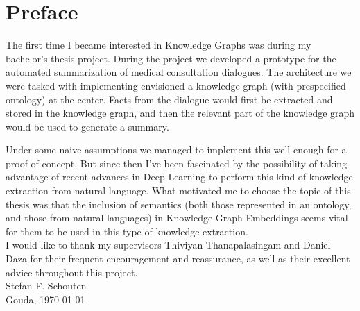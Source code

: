 \chapter{Preface}

The first time I became interested in Knowledge Graphs was during my bachelor's thesis project.
During the project we developed a prototype for the automated summarization of medical consultation dialogues. The architecture we were tasked with implementing envisioned a knowledge graph (with prespecified ontology) at the center. Facts from the dialogue would first be extracted and stored in the knowledge graph, and then the relevant part of the knowledge graph would be used to generate a summary.

Under some naive assumptions we managed to implement this well enough for a proof of concept. But since then I've been fascinated by the possibility of taking advantage of recent advances in Deep Learning to perform this kind of knowledge extraction from natural language.
What motivated me to choose the topic of this thesis was that the inclusion of semantics (both those represented in an ontology, and those from natural languages) in Knowledge Graph Embeddings seems vital for them to be used in this type of knowledge extraction. 
\\[0.5em]

\noindent I would like to thank my supervisors Thiviyan Thanapalasingam and Daniel Daza for their frequent encouragement and reassurance, as well as their excellent advice throughout this project.
\\[0.5cm]

\noindent
Stefan F. Schouten
\\[0.5cm]
 
\noindent
Gouda, \today